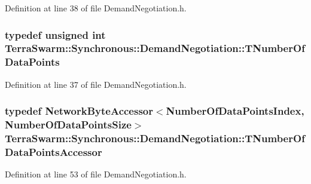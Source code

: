 Definition at line 38 of file Demand\-Negotiation.\-h.

\hypertarget{class_terra_swarm_1_1_synchronous_1_1_demand_negotiation_aeaaae7fc1861d9af2bff4c9dcb4d89ac}{
\subsubsection[{T\-Number\-Of\-Data\-Points}]{\setlength{\rightskip}{0pt plus 5cm}typedef unsigned int {\bf Terra\-Swarm\-::\-Synchronous\-::\-Demand\-Negotiation\-::\-T\-Number\-Of\-Data\-Points}}}\label{class_terra_swarm_1_1_synchronous_1_1_demand_negotiation_aeaaae7fc1861d9af2bff4c9dcb4d89ac}


Definition at line 37 of file Demand\-Negotiation.\-h.

\hypertarget{class_terra_swarm_1_1_synchronous_1_1_demand_negotiation_a86cc2804c82d511a7b9e037d041236bd}{
\subsubsection[{T\-Number\-Of\-Data\-Points\-Accessor}]{\setlength{\rightskip}{0pt plus 5cm}typedef {\bf Network\-Byte\-Accessor}$<${\bf Number\-Of\-Data\-Points\-Index}, {\bf Number\-Of\-Data\-Points\-Size}$>$ {\bf Terra\-Swarm\-::\-Synchronous\-::\-Demand\-Negotiation\-::\-T\-Number\-Of\-Data\-Points\-Accessor}\hspace{0.3cm}{\ttfamily [private]}}}\label{class_terra_swarm_1_1_synchronous_1_1_demand_negotiation_a86cc2804c82d511a7b9e037d041236bd}


Definition at line 53 of file Demand\-Negotiation.\-h.



